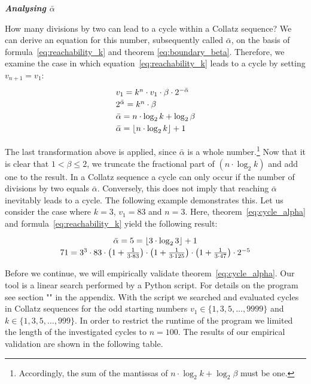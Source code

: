 \documentclass{SciPress_2015}
\renewcommand{\subsection}[1]{\textit{\textbf{#1}}}
\begin{document}
\vspace{1em}\noindent
\subsection{Analysing \boldmath$\bar\alpha$}
\par\noindent
How many divisions by two can lead to a cycle within a Collatz sequence? We can derive an equation for this number, subsequently called $\bar\alpha$, on the basis of formula~\ref{eq:reachability_k} and theorem \ref{eq:boundary_beta}. Therefore, we examine the case in which equation~\ref{eq:reachability_k} leads to a cycle by setting $v_{n+1}=v_1$:
\begin{equation}
\label{eq:cycle_alpha}
\def\arraystretch{1.2}\begin{array}{l}
	v_1=k^n\cdot v_1\cdot\beta\cdot2^{-\bar\alpha}\\
	2^{\bar\alpha}=k^n\cdot\beta\\
	\bar\alpha=n\cdot\log_2k+\log_2\beta\\
	\bar\alpha=\lfloor n\cdot\log_2k\rfloor+1
\end{array}
\end{equation}

The last transformation above is applied, since $\bar\alpha$ is a whole number.\footnote{Accordingly, the sum of the mantissas of $n\cdot\log_2k+\log_2\beta$ must be one.} Now that it is clear that $1<\beta\le2$, we truncate the fractional part of $(n\cdot \log_2k)$ and add one to the result. In a Collatz sequence a cycle can only occur if the number of divisions by two equals $\bar\alpha$. Conversely, this does not imply that reaching $\bar\alpha$ inevitably leads to a cycle. The following example demonstrates this. Let us consider the case where $k=3$, $v_1=83$ and $n=3$. Here, theorem~\ref{eq:cycle_alpha} and formula~\ref{eq:reachability_k} yield the following result:
\[
\def\arraystretch{1.2}\begin{array}{c}
\bar\alpha=5=\lfloor3\cdot\log_23\rfloor+1\\
71=3^3\cdot83\cdot\left(1+\frac{1}{3\cdot83}\right)\cdot\left(1+\frac{1}{3\cdot125}\right)\cdot\left(1+\frac{1}{3\cdot47}\right)\cdot2^{-5}
\end{array}
\]

\par
Before we continue, we will empirically validate theorem~\ref{eq:cycle_alpha}. Our tool is a linear search performed by a Python script. For details on the program see section "" in the appendix. With the script we searched and evaluated cycles in Collatz sequences for the odd starting numbers $v_1\in\{1,3,5,\ldots,9999\}$ and $k\in\{1,3,5,\ldots,999\}$. In order to restrict the runtime of the program we limited the length of the investigated cycles to $n=100$. The results of our empirical validation are shown in the following table.
\end{document}
